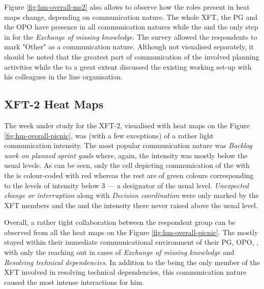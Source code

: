 Figure \ref{fig:hm-overall-ms2} also allows to observe how the roles present in heat maps change, depending on communication nature. The whole \ac{XFT}, the \ac{PG} and the \ac{OPO} have presence in all communication natures while the  and the  only step in for the \emph{Exchange of missing knowledge}. The survey allowed the respondents to mark "Other" as a communication nature. Although not visualised separately, it should be noted that the greatest part of communication of the  involved planning activities while the  to a great extent discussed the existing working set-up with his colleagues in the line organisation.

\subsection{XFT-2 Heat Maps}
\label{sec:findings-xft2-hm}
The week under study for the \ac{XFT}-2, visualised with heat maps on the Figure \ref{fig:hm-overall-picnic}, was (with a few exceptions) of a rather light communication intensity. The most popular communication nature was \emph{Backlog work on planned sprint goals} where, again, the intensity was mostly below the usual levels. As can be seen, only the cell depicting communication of the  with the  is colour-coded with red whereas the rest are of green colours corresponding to the levels of intensity below 3 --- a designator of the usual level. \emph{Unexpected change or interruption} along with \emph{Decision coordination} were only marked by the XFT members and the  and the intensity there never raised above the usual level.

Overall, a rather tight collaboration between the respondent group can be observed from all the heat maps on the Figure \ref{fig:hm-overall-picnic}. The  mostly stayed within their immediate communicational environment of their \ac{PG}, \ac{OPO}, , with only the  reaching out in cases of \emph{Exchange of missing knowledge} and \emph{Resolving technical dependencies}. In addition to the  being the only member of the \ac{XFT} involved in resolving technical dependencies, this communication nature caused the most intense interactions for him.

